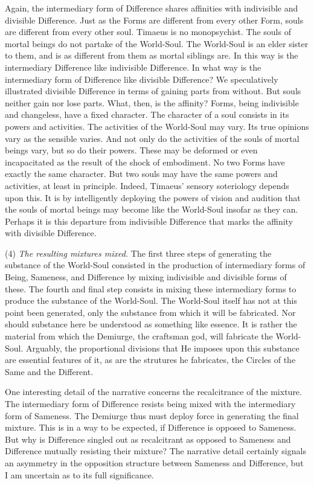 Again, the intermediary form of Difference shares affinities with indivisible and divisible Difference. Just as the Forms are different from every other Form, souls are different from every other soul. Timaeus is no monopsychist. The souls of mortal beings do not partake of the World-Soul. The World-Soul is an elder sister to them, and is as different from them as mortal siblings are. In this way is the intermediary Difference like indivisible Difference. In what way is the intermediary form of Difference like divisible Difference? We speculatively illustrated divisible Difference in terms of gaining parts from without. But souls neither gain nor lose parts. What, then, is the affinity? Forms, being indivisible and changeless, have a fixed character. The character of a soul consists in its powers and activities. The activities of the World-Soul may vary. Its true opinions vary as the sensible varies. And not only do the activities of the souls of mortal beings vary, but so do their powers. These may be deformed or even incapacitated as the result of the shock of embodiment. No two Forms have exactly the same character. But two souls may have the same powers and activities, at least in principle. Indeed, Timaeus' sensory soteriology depends upon this. It is by intelligently deploying the powers of vision and audition that the souls of mortal beings may become like the World-Soul insofar as they can. Perhaps it is this departure from indivisible Difference that marks the affinity with divisible Difference.

(4) \emph{The resulting mixtures mixed.} The first three steps of generating the substance of the World-Soul consisted in the production of intermediary forms of Being, Sameness, and Difference by mixing indivisible and divisible forms of these. The fourth and final step consists in mixing these intermediary forms to produce the substance of the World-Soul. The World-Soul itself has not at this point been generated, only the substance from which it will be fabricated. Nor should substance here be understood as something like essence. It is rather the material from which the Demiurge, the craftsman god, will fabricate the World-Soul. Arguably, the proportional divisions that He imposes upon this substance are essential features of it, as are the strutures he fabricates, the Circles of the Same and the Different.

One interesting detail of the narrative concerns the recalcitrance of the mixture. The intermediary form of Difference resists being mixed with the intermediary form of Sameness. The Demiurge thus must deploy force in generating the final mixture. This is in a way to be expected, if Difference is opposed to Sameness. But why is Difference singled out as recalcitrant as opposed to Sameness and Difference mutually resisting their mixture? The narrative detail certainly signals an asymmetry in the opposition structure between Sameness and Difference, but I am uncertain as to its full significance.


